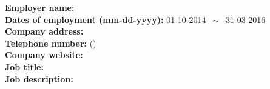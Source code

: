 \textbf{Employer name}:  \\
\textbf{Dates of employment (mm-dd-yyyy):} 01-10-2014 $\,\sim\,$ 31-03-2016 \\
\textbf{Company address:}  \\
\textbf{Telephone number:} ()  \\
\textbf{Company website:}  \\
\textbf{Job title:}  \\
\textbf{Job description:}  \\ 